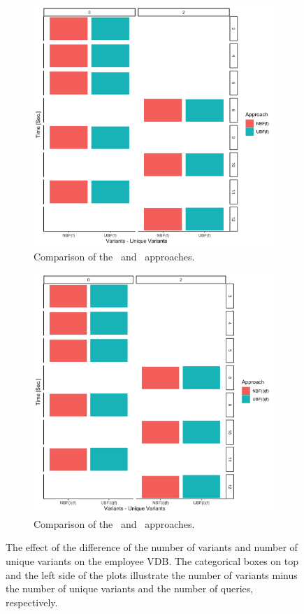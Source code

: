 \begin{figure}[!t]
\begin{subfigure}{0.5\linewidth}
\includegraphics[width=.7\textwidth]{figs/plots/emp-nbff-ubff.png}
\caption[Comparison of the \nbff\ and \ubff\ approaches]{Comparison of the \nbff\ and \ubff\ approaches.}
\label{fig:emp-ubff-ubff}
\end{subfigure}
\begin{subfigure}{0.5\linewidth}
\centering
\includegraphics[width=.7\textwidth]{figs/plots/emp-nbfif-ubfif.png}
\caption[Comparison of the \nbfif\ and \ubfif\ approaches]{Comparison of the \nbfif\ and \ubfif\ approaches.}
\label{fig:emp-nbfif-ubfif}
\end{subfigure}
\caption[The effect of the difference of the number of variants and number of unique variants on
the employee VDB]{The effect of the difference of the number of variants and number of unique 
variants on the employee VDB. The categorical boxes on top and the left side of the plots illustrate
the number of variants minus the number of unique variants and the number of queries, respectively.}
\label{fig:emp-vars-minus}
\end{figure}

